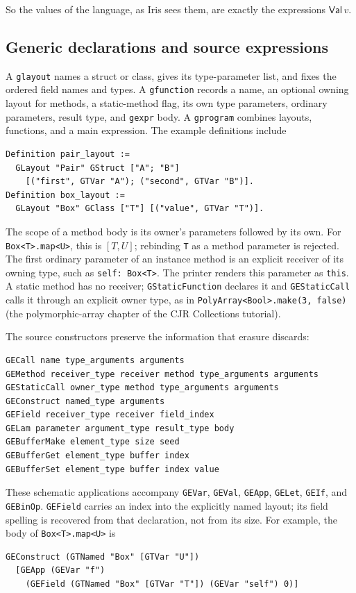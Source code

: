 \documentclass[11pt]{article}
\begin{document}
So the values of the language, as Iris sees them, are exactly the expressions \(\mathsf{Val}\,v\).

\subsection{Generic declarations and source expressions}
\label{sec:generic-source}

A \texttt{glayout} names a struct or class, gives its type-parameter list,
and fixes the ordered field names and types. A \texttt{gfunction} records
a name, an optional owning layout for methods, a static-method flag, its own type parameters,
ordinary parameters, result type, and \texttt{gexpr} body. A \texttt{gprogram}
combines layouts, functions, and a main expression. The example definitions
include
\begin{lstlisting}
Definition pair_layout :=
  GLayout "Pair" GStruct ["A"; "B"]
    [("first", GTVar "A"); ("second", GTVar "B")].
Definition box_layout :=
  GLayout "Box" GClass ["T"] [("value", GTVar "T")].
\end{lstlisting}
The scope of a method body is its owner's parameters followed by its own.
For \texttt{Box<T>.map<U>}, this is \([T,U]\); rebinding \texttt{T} as a
method parameter is rejected. The first ordinary parameter of an instance method is
an explicit receiver of its owning type, such as \texttt{self: Box<T>}.
The printer renders this parameter as \texttt{this}. A static method has
no receiver; \texttt{GStaticFunction} declares it and \texttt{GEStaticCall}
calls it through an explicit owner type, as in
\texttt{PolyArray<Bool>.make(3, false)} (the polymorphic-array chapter of the CJR Collections tutorial).

The source constructors preserve the information that erasure discards:
\begin{lstlisting}
GECall name type_arguments arguments
GEMethod receiver_type receiver method type_arguments arguments
GEStaticCall owner_type method type_arguments arguments
GEConstruct named_type arguments
GEField receiver_type receiver field_index
GELam parameter argument_type result_type body
GEBufferMake element_type size seed
GEBufferGet element_type buffer index
GEBufferSet element_type buffer index value
\end{lstlisting}
These schematic applications accompany \texttt{GEVar}, \texttt{GEVal},
\texttt{GEApp}, \texttt{GELet}, \texttt{GEIf}, and \texttt{GEBinOp}.
\texttt{GEField} carries an index into the explicitly named layout; its
field spelling is recovered from that declaration, not from its size.
For example, the body of \texttt{Box<T>.map<U>} is
\begin{lstlisting}
GEConstruct (GTNamed "Box" [GTVar "U"])
  [GEApp (GEVar "f")
    (GEField (GTNamed "Box" [GTVar "T"]) (GEVar "self") 0)]
\end{lstlisting}
\end{document}

